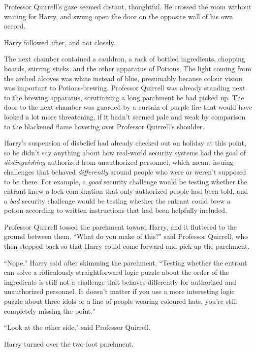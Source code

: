 Professor Quirrell's gaze seemed distant, thoughtful. He crossed the room without waiting for Harry, and swung open the door on the opposite wall of his own accord.

Harry followed after, and not closely.

\later

The next chamber contained a cauldron, a rack of bottled ingredients, chopping boards, stirring sticks, and the other apparatus of Potions. The light coming from the arched alcoves was white instead of blue, presumably because colour vision was important to Potions-brewing. Professor Quirrell was already standing next to the brewing apparatus, scrutinizing a long parchment he had picked up. The door to the next chamber was guarded by a curtain of purple fire that would have looked a lot more threatening, if it hadn't seemed pale and weak by comparison to the blackened flame hovering over Professor Quirrell's shoulder.

Harry's suspension of disbelief had already checked out on holiday at this point, so he didn't say anything about how real-world security systems had the goal of \emph{distinguishing} authorized from unauthorized personnel, which meant issuing challenges that behaved \emph{differently} around people who were or weren't supposed to be there. For example, a \emph{good} security challenge would be testing whether the entrant knew a lock combination that only authorized people had been told, and a \emph{bad} security challenge would be testing whether the entrant could brew a potion according to written instructions that had been helpfully included.

Professor Quirrell tossed the parchment toward Harry, and it fluttered to the ground between them. ``What do you make of this?" said Professor Quirrell, who then stepped back so that Harry could come forward and pick up the parchment.

``Nope," Harry said after skimming the parchment. ``Testing whether the entrant can solve a ridiculously straightforward logic puzzle about the order of the ingredients is still not a challenge that behaves differently for authorized and unauthorized personnel. It doesn't matter if you use a more interesting logic puzzle about three idols or a line of people wearing coloured hats, you're still completely missing the point."

``Look at the other side," said Professor Quirrell.

Harry turned over the two-foot parchment.

